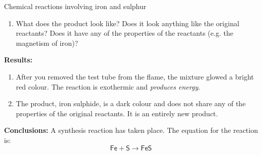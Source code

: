 \begin{g_experiment}{Chemical reactions involving iron and sulphur }
\begin{enumerate}[noitemsep, label=\textbf{\arabic*}. ]
\label{m38709*uid24}\item What does the product look like? Does it look anything like the original reactants? Does it have any of the properties of the reactants (e.g. the magnetism of iron)?
\end{enumerate}
        \par 
        \label{m38709*eip-963}
	\par
      \label{m38709*id63554}\noindent{}\textbf{Results:}
          \newline
        \label{m38709*id63560}\begin{enumerate}[noitemsep, label=\textbf{\arabic*}. ] 
            \label{m38709*uid25}\item After you removed the test tube from the flame, the mixture glowed a bright red colour. The reaction is exothermic and \textsl{produces energy}.
\label{m38709*uid26}\item The product, iron sulphide, is a dark colour and does not share any of the properties of the original reactants. It is an entirely new product.
\end{enumerate}
        \par 
        \label{m38709*id63594}\noindent{}\textbf{Conclusions:}
          \newline
A synthesis reaction has taken place. The equation for the reaction is:
        \label{m38709*id63604}\nopagebreak\noindent{}
    \begin{equation}
    \mathsf{Fe}+\mathsf{S}\to \mathsf{FeS}\tag{12.6}
      \end{equation}
    \par 
\end{g_experiment}
\label{m38709*secfhsst!!!underscore!!!id294}
